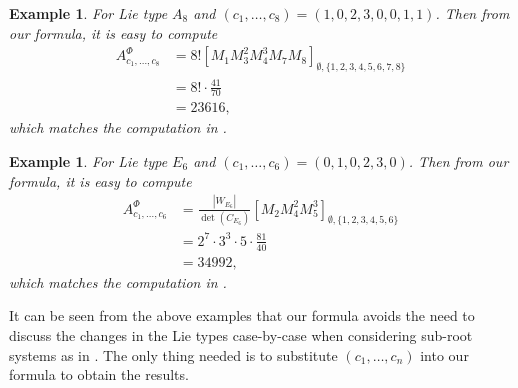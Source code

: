 \documentclass[11pt, letterpaper]{amsart}
\numberwithin{equation}{section}
\newtheorem{eg}[theorem]{Example}
\begin{document}
\begin{eg}
    For Lie type $A_8$ and $(c_1,\ldots,c_8)=(1,0,2,3,0,0,1,1)$. Then from our formula, it is easy to compute
    \begin{align*}A_{c_1,\ldots,c_8}^{\Phi}&=8!\left[M_{1}M_{3}^2M_{4}^3M_{7}M_{8}\right]_{\emptyset,\{1,2,3,4,5,6,7,8\}}\\ 
    &=8!\cdot\frac{41}{70}\\
    &=23616,
    \end{align*}
    which matches the computation in \cite[Example 5.4]{Horiguchi2024mixed}.
\end{eg}

\begin{eg}
    For Lie type $E_6$ and $(c_1,\ldots,c_6)=(0,1,0,2,3,0)$. Then from our formula, it is easy to compute
    \begin{align*}
        A_{c_1,\ldots,c_6}^{\Phi}&=\frac{|W_{E_6}|}{\det(C_{E_6})}\left[M_{2}M_{4}^2M_{5}^3\right]_{\emptyset,\{1,2,3,4,5,6\}}\\
        &= 2^7\cdot 3^3\cdot5\cdot\frac{81}{40}\\
        &=34992,
    \end{align*}
    which matches the computation in \cite[Example 7.21]{Horiguchi2024mixed}. 
\end{eg}

It can be seen from the above examples that our formula avoids the need to discuss the changes in the Lie types case-by-case when considering sub-root systems as in \cite[Section 7]{Horiguchi2024mixed}. The only thing needed is to substitute $(c_1,\ldots,c_n)$ into our formula to obtain the results.



\end{document}
